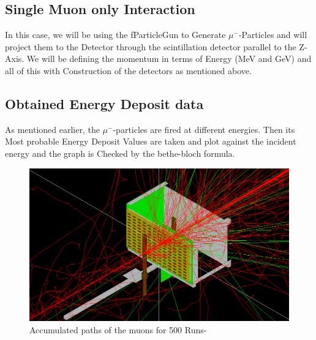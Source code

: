 \documentclass{article}
\begin{document}
\begin{multicols}{2}







\section{Single Muon only Interaction}

In this case, we will be using the fParticleGun to Generate $\mu^-$-Particles 
and will project them to the Detector through the scintillation detector 
parallel to the Z-Axis. We will be defining the momentum in terms of Energy (MeV and GeV) and all of this
with Construction of the detectors as mentioned above. 


\subsection{Obtained Energy Deposit data}

As mentioned earlier, the $\mu^-$-particles are fired at different
energies. Then its Most probable Energy Deposit Values are taken 
and plot against the incident energy and the graph is Checked by the
bethe-bloch formula.


\begin{figure}[H]
    \centering	
     \includegraphics[width=\columnwidth]{ED4GeVaccu.png}
     \caption{Accumulated paths of the muons for 500 Runs-\cite{agostinelli2003geant4}}
     \label{ED4GeVaccu}
\end{figure}



\end{multicols}
\end{document}
